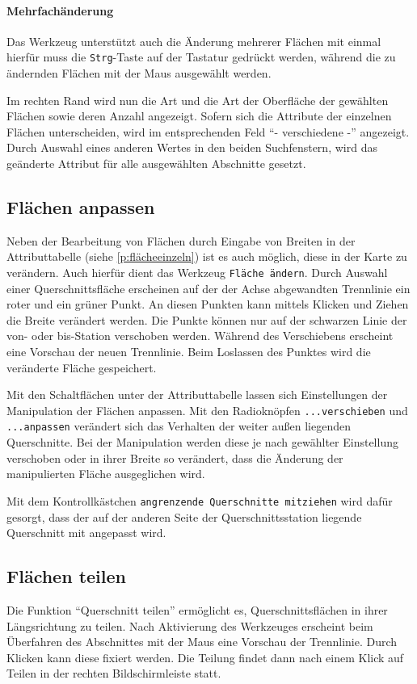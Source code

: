 \documentclass[a4paper,11pt,bibliography=totoc, listof=totoc,titlepage]{scrartcl}
\begin{document}
\paragraph{Mehrfachänderung}
Das Werkzeug unterstützt auch die Änderung mehrerer Flächen mit einmal hierfür muss die \verb|Strg|-Taste auf der Tastatur gedrückt werden, während die zu ändern\-den Flächen mit der Maus ausgewählt werden.

Im rechten Rand wird nun die Art und die Art der Oberfläche der gewählten Flächen sowie deren Anzahl angezeigt. Sofern sich die Attribute der einzelnen Flächen unterscheiden, wird im entsprechenden Feld ``- verschiedene -'' angezeigt. Durch Auswahl eines anderen Wertes in den beiden \Gls{Suchfenster}n, wird das geänderte Attribut für alle ausgewählten Abschnitte gesetzt.

\subsection{Flächen anpassen}
Neben der Bearbeitung von Flächen durch Eingabe von Breiten in der Attributtabelle (siehe \autoref{p:flächeeinzeln}) ist es auch möglich, diese in der Karte zu verändern. Auch hierfür dient das Werkzeug \verb|Fläche ändern|. Durch Auswahl einer Querschnittsfläche erscheinen auf der der Achse abgewandten Trennlinie ein roter und ein grüner Punkt. An diesen Punkten kann mittels Klicken und Ziehen die Breite verändert werden. Die Punkte können nur auf der schwarzen Linie der von- oder bis-Station verschoben werden. Während des Verschiebens erscheint eine Vorschau der neuen Trennlinie. Beim Loslassen des Punktes wird die veränderte Fläche gespeichert.

Mit den Schaltflächen unter der Attributtabelle lassen sich Einstellungen der Manipulation der Flächen anpassen. Mit den Radioknöpfen \verb|...verschieben| und \verb|...anpassen| verändert sich das Verhalten der weiter außen liegenden Querschnitte. Bei der Manipulation werden diese je nach gewählter Einstellung verschoben oder in ihrer Breite so verändert, dass die Änderung der manipulierten Fläche ausgeglichen wird.

Mit dem Kontrollkästchen \verb|angrenzende Querschnitte mitziehen| wird dafür gesorgt, dass der auf der anderen Seite der Querschnittsstation liegende Querschnitt mit angepasst wird.

\subsection{Flächen teilen}
Die Funktion ``Querschnitt teilen'' ermöglicht es, Querschnittsflächen in ihrer Längsrichtung zu teilen. Nach Aktivierung des Werkzeuges erscheint beim Überfahren des Abschnittes mit der Maus eine Vorschau der Trennlinie. Durch Klicken kann diese fixiert werden. Die Teilung findet dann nach einem Klick auf Teilen in der rechten Bildschirmleiste statt.
\end{document}
